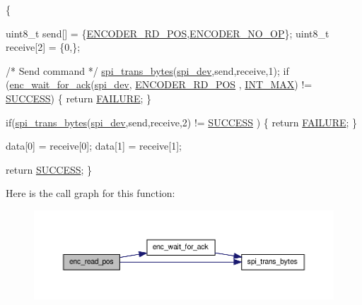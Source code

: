 \begin{DoxyCode}
                                                      \{

    uint8\_t send[] = \{\hyperlink{encoder__functions_8h_a24e6c0e05e904b10f56ae184da9e2aca}{ENCODER\_RD\_POS},\hyperlink{encoder__functions_8h_ac10b0f18ed2164776ad6843aa7908592}{ENCODER\_NO\_OP}\};
    uint8\_t receive[2] = \{0,\};
    
    \textcolor{comment}{/* Send command */}
    \hyperlink{communication_2spi__functions_8c_a3ae450d2b3ece27bb6036f811a7625a9}{spi\_trans\_bytes}(\hyperlink{CommunicationV0_2communication_8c_a4788f0a5355494bc6c13690e28f43783}{spi\_dev},send,receive,1);
    \textcolor{keywordflow}{if} (\hyperlink{group__enc_gad82fb44f2e735628ec95e003e4a1f93c}{enc\_wait\_for\_ack}(\hyperlink{CommunicationV0_2communication_8c_a4788f0a5355494bc6c13690e28f43783}{spi\_dev}, \hyperlink{encoder__functions_8h_a24e6c0e05e904b10f56ae184da9e2aca}{ENCODER\_RD\_POS}
      , \hyperlink{encoder__functions_8h_a9ec306f36d50c7375e74f0d1c55a3a67}{INT\_MAX}) != \hyperlink{calibration_2calibration_8h_aa90cac659d18e8ef6294c7ae337f6b58}{SUCCESS}) \{ 
        \textcolor{keywordflow}{return} \hyperlink{calibration_2calibration_8h_a6d58f9ac447476b4e084d7ca383f5183}{FAILURE}; 
    \}

    \textcolor{keywordflow}{if}(\hyperlink{communication_2spi__functions_8c_a3ae450d2b3ece27bb6036f811a7625a9}{spi\_trans\_bytes}(\hyperlink{CommunicationV0_2communication_8c_a4788f0a5355494bc6c13690e28f43783}{spi\_dev},send,receive,2) != \hyperlink{calibration_2calibration_8h_aa90cac659d18e8ef6294c7ae337f6b58}{SUCCESS}
      ) \{ 
        \textcolor{keywordflow}{return} \hyperlink{calibration_2calibration_8h_a6d58f9ac447476b4e084d7ca383f5183}{FAILURE}; 
    \}

   data[0] = receive[0];
   data[1] = receive[1];

   \textcolor{keywordflow}{return} \hyperlink{calibration_2calibration_8h_aa90cac659d18e8ef6294c7ae337f6b58}{SUCCESS};
\}
\end{DoxyCode}


Here is the call graph for this function\-:
\nopagebreak
\begin{figure}[H]
\begin{center}
\leavevmode
\includegraphics[width=350pt]{group__enc_ga813c09cc4d9af8b357fe440a9438e685_cgraph}
\end{center}
\end{figure}




